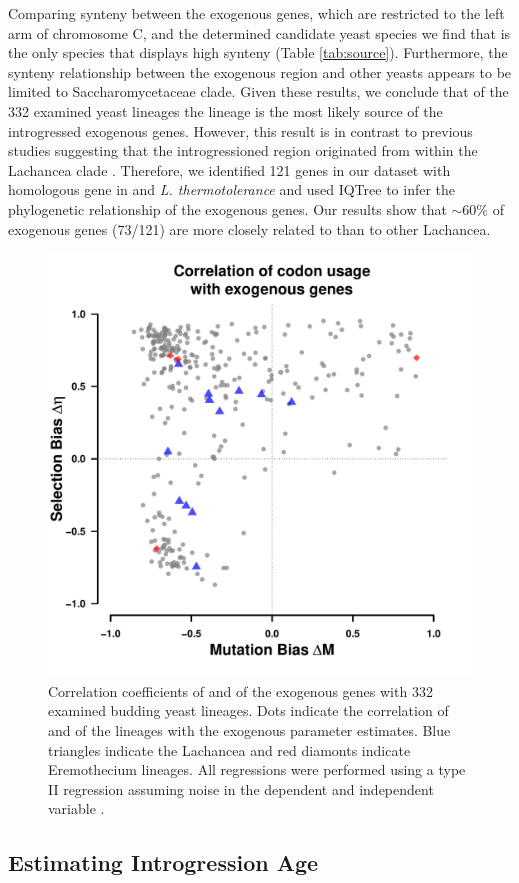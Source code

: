 \documentclass[fleqn,letterpaper]{article}
\begin{document}
Comparing synteny between the exogenous genes, which are restricted to the left arm of chromosome C, and the determined candidate yeast species we find that \gossypii is the only species that displays high synteny (Table \ref{tab:source}).
Furthermore, the synteny relationship between the exogenous region and other yeasts appears to be limited to Saccharomycetaceae clade.
Given these results, we conclude that of the 332 examined yeast lineages the \gossypii lineage is the most likely source of the introgressed exogenous genes.
However, this result is in contrast to previous studies suggesting that the introgressioned region originated from within the Lachancea clade \citep{payen2009, vakirlis2016}.
Therefore, we identified 121 genes in our dataset \citep{shen2018} with homologous gene in \gossypii and \textit{L. thermotolerance} and used IQTree \citep{nguyen2015} to infer the phylogenetic relationship of the exogenous genes. Our results show that $\sim 60 \%$ of exogenous genes (73/121) are more closely related to \gossypii than to other Lachancea.


\begin{figure}
     \centering
	\includegraphics[width=.45\textwidth]{img/csp_mean_correlation_exo.pdf}
	\caption{Correlation coefficients of \DM and \DE of the exogenous genes with 332 examined budding yeast lineages. 
	Dots indicate the correlation of \DM and \DE of the lineages with the exogenous parameter estimates.
	Blue triangles indicate the Lachancea and red diamonts indicate Eremothecium lineages.
	All regressions were performed using a type II regression assuming noise in the dependent and independent variable \citep{SokalAndRohlf1981}.}
	\label{fig:csp_exo_comp}
\end{figure}


\subsection*{Estimating Introgression Age}
\end{document}
